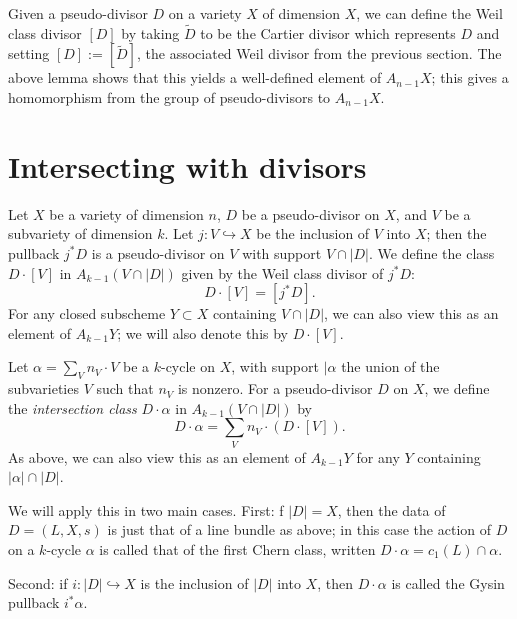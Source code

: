 \documentclass[12pt]{article}
\theoremstyle{definition}
\theoremstyle{theorem}
\newcommand{\1}{\mathbbm 1}
\newcommand{\inject}{\hookrightarrow}
\begin{document}
Given a pseudo-divisor $D$ on a variety $X$ of dimension $X$, we can define the Weil class divisor $[D]$ by taking $\tilde D$ to be the Cartier divisor which represents $D$ and setting $[D] := [\tilde D]$, the associated Weil divisor from the previous section. The above lemma shows that this yields a well-defined element of $A_{n-1} X$; this gives a homomorphism from the group of pseudo-divisors to $A_{n-1} X$.

\section{Intersecting with divisors}
Let $X$ be a variety of dimension $n$, $D$ be a pseudo-divisor on $X$, and $V$ be a subvariety of dimension $k$. Let $j: V \inject X$ be the inclusion of $V$ into $X$; then the pullback $j^* D$ is a pseudo-divisor on $V$ with support $V \cap |D|$. We define the class $D \cdot [V]$ in $A_{k-1} (V \cap |D|)$ given by the Weil class divisor of $j^* D$: \[ D \cdot [V] = [j^* D] . \] For any closed subscheme $Y \subset X$ containing $V \cap |D|$, we can also view this as an element of $A_{k-1} Y$; we will also denote this by $D \cdot [V]$.

Let $\alpha = \sum_V n_V \cdot V$ be a $k$-cycle on $X$, with support $|\alpha$ the union of the subvarieties $V$ such that $n_V$ is nonzero. For a pseudo-divisor $D$ on $X$, we define the {\em intersection class} $D \cdot \alpha$ in $A_{k-1}(V \cap |D|)$ by \[ D \cdot \alpha = \sum_V n_V \cdot (D \cdot [V]) . \] As above, we can also view this as an element of $A_{k-1} Y$ for any $Y$ containing $|\alpha| \cap |D|$.

We will apply this in two main cases. First: f $|D| = X$, then the data of $D = (L, X, s)$ is just that of a line bundle as above; in this case the action of $D$ on a $k$-cycle $\alpha$ is called that of the first Chern class, written $D \cdot \alpha = c_1(L) \cap \alpha$.

Second: if $i: |D| \inject X$ is the inclusion of $|D|$ into $X$, then $D \cdot \alpha$ is called the Gysin pullback $i^* \alpha$.
\end{document}
